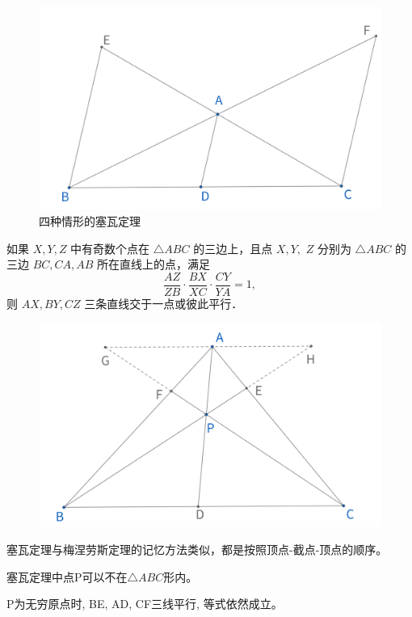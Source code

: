 \begin{figure}[H]
\begin{minipage}[t]{0.2\textwidth}
    \end{minipage}
    \begin{minipage}[t]{0.2\textwidth}
    \centering
    \includegraphics[width=\linewidth]{figures/ceva4.png}
    \end{minipage}
    \caption{四种情形的塞瓦定理}
\end{figure}


\begin{theorem}
如果 $X ,  Y ,  Z$ 中有奇数个点在 $\triangle A B C$ 的三边上，且点 $X ,  Y , $ $Z$ 分别为 $\triangle A B C$ 的三边 $B C ,  C A ,  A B$ 所在直线上的点，满足 
$$\frac{A Z}{Z B} \cdot \frac{B X}{X C} \cdot \frac{C Y}{Y A}=1,$$
则 $A X ,  B Y ,  C Z$ 三条直线交于一点或彼此平行．
\end{theorem}


\begin{figure}[H]
    \centering
    \includegraphics[width=0.6\linewidth]{figures/ceva-proof1.png}
\end{figure}
\begin{remark}
    塞瓦定理与梅涅劳斯定理的记忆方法类似，都是按照顶点-截点-顶点的顺序。

    塞瓦定理中点P可以不在$\triangle ABC$形内。
    
    P为无穷原点时, BE, AD, CF三线平行, 等式依然成立。

    
\end{remark}


